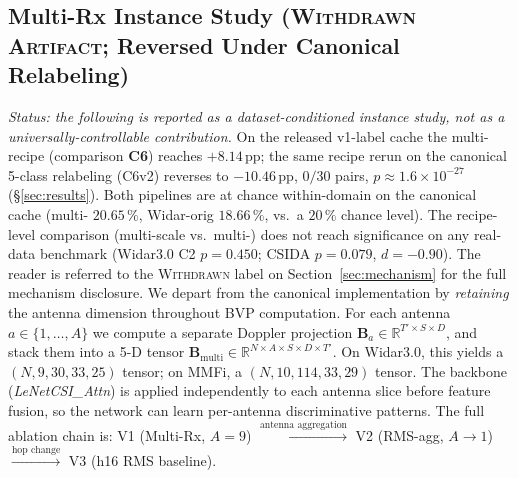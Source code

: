 \documentclass[journal,11pt]{IEEEtran}
\newcommand{\Rx}{\text{Rx}}
\begin{document}
\subsection{Multi-Rx Instance Study (\textsc{Withdrawn Artifact}; Reversed Under Canonical Relabeling)}
\label{sec:multirx-instance}
\emph{Status: the following is reported as a dataset-conditioned instance study, not as a universally-controllable contribution.} On the released v1-label cache the multi-\Rx{} recipe (comparison \textbf{C6}) reaches $+8.14$\,pp; the same recipe rerun on the canonical 5-class relabeling (C6v2) reverses to $-10.46$\,pp, $0/30$ pairs, $p \approx 1.6 \times 10^{-27}$ (\S\ref{sec:results}). Both pipelines are at chance within-domain on the canonical cache (multi-\Rx{} $20.65\,\%$, Widar-orig $18.66\,\%$, vs.\ a $20\,\%$ chance level). The recipe-level comparison (multi-scale vs.\ multi-\Rx{}) does not reach significance on any real-data benchmark (Widar3.0 C2 $p = 0.450$; CSIDA $p = 0.079$, $d = -0.90$). The reader is referred to the \textsc{Withdrawn} label on Section~\ref{sec:mechanism} for the full mechanism disclosure.
We depart from the canonical implementation by \emph{retaining} the antenna dimension throughout BVP computation. For each antenna $a \in \{1, \ldots, A\}$ we compute a separate Doppler projection $\mathbf{B}_a \in \mathbb{R}^{T' \times S \times D}$, and stack them into a 5-D tensor $\mathbf{B}_{\text{multi}} \in \mathbb{R}^{N \times A \times S \times D \times T'}$. On Widar3.0, this yields a $(N, 9, 30, 33, 25)$ tensor; on MMFi, a $(N, 10, 114, 33, 29)$ tensor. The backbone (\textit{LeNetCSI\_Attn}) is applied independently to each antenna slice before feature fusion, so the network can learn per-antenna discriminative patterns. The full ablation chain is: V1 (Multi-Rx, $A=9$) $\xrightarrow{\text{antenna aggregation}}$ V2 (RMS-agg, $A \to 1$) $\xrightarrow{\text{hop change}}$ V3 (h16 RMS baseline).
\end{document}
